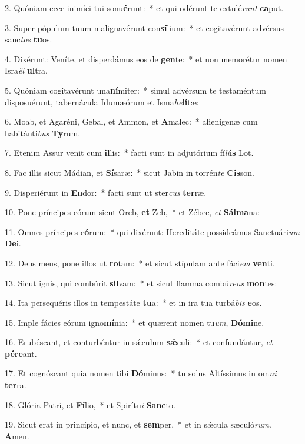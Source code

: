2. Quóniam ecce inimíci tui sonu\textbf{é}runt:~*  et qui odérunt te extulé\textit{runt} \textbf{ca}put.\

3. Super pópulum tuum malignavérunt con\textbf{sí}lium:~*  et cogitavérunt advérsus sanc\textit{tos} \textbf{tu}os.\

4. Dixérunt: Veníte, et disperdámus eos de \textbf{gen}te:~*  et non memorétur nomen Isra\textit{ël} \textbf{ul}tra.\

5. Quóniam cogitavérunt una\textbf{ní}miter:~*  simul advérsum te testaméntum disposuérunt, tabernácula Idumæórum et Isma\textit{he}\textbf{lí}tæ:\

6. Moab, et Agaréni, Gebal, et Ammon, et \textbf{A}malec:~*  alienígenæ cum habitánti\textit{bus} \textbf{Ty}rum.\

7. Etenim Assur venit cum \textbf{il}lis:~*  facti sunt in adjutórium fí\textit{li}\textbf{is} Lot.\

8. Fac illis sicut Mádian, et \textbf{Sí}saræ:~*  sicut Jabin in torrén\textit{te} \textbf{Cis}son.\

9. Disperiérunt in \textbf{En}dor:~*  facti sunt ut ster\textit{cus} \textbf{ter}ræ.\

10. Pone príncipes eórum sicut Oreb, \textbf{et} Zeb,~*  et Zébee, \textit{et} \textbf{Sál}\textbf{ma}na:\

11. Omnes príncipes e\textbf{ó}rum:~*  qui dixérunt: Hereditáte possideámus Sanctuári\textit{um} \textbf{De}i.\

12. Deus meus, pone illos ut \textbf{ro}tam:~*  et sicut stípulam ante fáci\textit{em} \textbf{ven}ti.\

13. Sicut ignis, qui combúrit \textbf{sil}vam:~*  et sicut flamma combú\textit{rens} \textbf{mon}tes:\

14. Ita persequéris illos in tempestáte \textbf{tu}a:~*  et in ira tua turbá\textit{bis} \textbf{e}os.\

15. Imple fácies eórum igno\textbf{mí}nia:~*  et quærent nomen tu\textit{um}, \textbf{Dó}\textbf{mi}ne.\

16. Erubéscant, et conturbéntur in sǽculum \textbf{sǽ}culi:~*  et confundántur, \textit{et} \textbf{pér}\textbf{e}ant.\

17. Et cognóscant quia nomen tibi \textbf{Dó}minus:~*  tu solus Altíssimus in om\textit{ni} \textbf{ter}ra.\

18. Glória Patri, et \textbf{Fí}lio,~*  et Spirítu\textit{i} \textbf{Sanc}to.\

19. Sicut erat in princípio, et nunc, et \textbf{sem}per,~*  et in sǽcula sæculó\textit{rum}. \textbf{A}men.\

